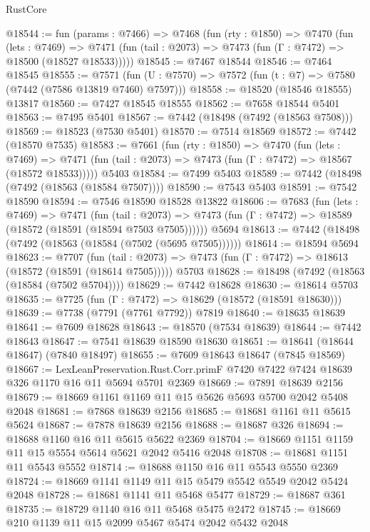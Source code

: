 \begin{lexlean}{RustCore}
\begin{coremodule}
@18544 := fun (params : @7466) =>
  @7468
    (fun (rty : @1850) =>
    @7470
      (fun (lets : @7469) =>
      @7471 (fun (tail : @2073) => @7473 (fun (Γ : @7472) => @18500 (@18527 @18533)))))
@18545 := @7467 @18544
@18546 := @7464 @18545
@18555 := @7571
    (fun (U : @7570) => @7572 (fun (t : @7) => @7580 (@7442 (@7586 @13819 @7460) @7597)))
@18558 := @18520 (@18546 @18555) @13817
@18560 := @7427 @18545 @18555
@18562 := @7658 @18544 @5401
@18563 := @7495 @5401
@18567 := @7442 (@18498 (@7492 (@18563 @7508)))
@18569 := @18523 (@7530 @5401)
@18570 := @7514 @18569
@18572 := @7442 (@18570 @7535)
@18583 := @7661
    (fun (rty : @1850) =>
    @7470
      (fun (lets : @7469) =>
      @7471 (fun (tail : @2073) => @7473 (fun (Γ : @7472) => @18567 (@18572 @18533)))))
    @5403
@18584 := @7499 @5403
@18589 := @7442 (@18498 (@7492 (@18563 (@18584 @7507))))
@18590 := @7543 @5403
@18591 := @7542 @18590
@18594 := @7546 @18590 @18528 @13822
@18606 := @7683
    (fun (lets : @7469) =>
    @7471
      (fun (tail : @2073) =>
      @7473 (fun (Γ : @7472) => @18589 (@18572 (@18591 (@18594 @7503 @7505))))))
    @5694
@18613 := @7442 (@18498 (@7492 (@18563 (@18584 (@7502 (@5695 @7505))))))
@18614 := @18594 @5694
@18623 := @7707
    (fun (tail : @2073) => @7473 (fun (Γ : @7472) => @18613 (@18572 (@18591 (@18614 @7505)))))
    @5703
@18628 := @18498 (@7492 (@18563 (@18584 (@7502 @5704))))
@18629 := @7442 @18628
@18630 := @18614 @5703
@18635 := @7725 (fun (Γ : @7472) => @18629 (@18572 (@18591 @18630)))
@18639 := @7738 (@7791 (@7761 @7792)) @7819
@18640 := @18635 @18639
@18641 := @7609 @18628
@18643 := @18570 (@7534 @18639)
@18644 := @7442 @18643
@18647 := @7541 @18639 @18590 @18630
@18651 := @18641 (@18644 @18647) (@7840 @18497)
@18655 := @7609 @18643 @18647 (@7845 @18569)
@18667 := LexLeanPreservation.Rust.Corr.primF
    @7420
    @7422
    @7424
    @18639
    @326
    @1170
    @16
    @11
    @5694
    @5701
    @2369
@18669 := @7891 @18639 @2156
@18679 := @18669 @1161 @1169 @11 @15 @5626 @5693 @5700 @2042 @5408 @2048
@18681 := @7868 @18639 @2156
@18685 := @18681 @1161 @11 @5615 @5624
@18687 := @7878 @18639 @2156
@18688 := @18687 @326
@18694 := @18688 @1160 @16 @11 @5615 @5622 @2369
@18704 := @18669 @1151 @1159 @11 @15 @5554 @5614 @5621 @2042 @5416 @2048
@18708 := @18681 @1151 @11 @5543 @5552
@18714 := @18688 @1150 @16 @11 @5543 @5550 @2369
@18724 := @18669 @1141 @1149 @11 @15 @5479 @5542 @5549 @2042 @5424 @2048
@18728 := @18681 @1141 @11 @5468 @5477
@18729 := @18687 @361
@18735 := @18729 @1140 @16 @11 @5468 @5475 @2472
@18745 := @18669 @210 @1139 @11 @15 @2099 @5467 @5474 @2042 @5432 @2048

\end{coremodule}
\end{lexlean}
